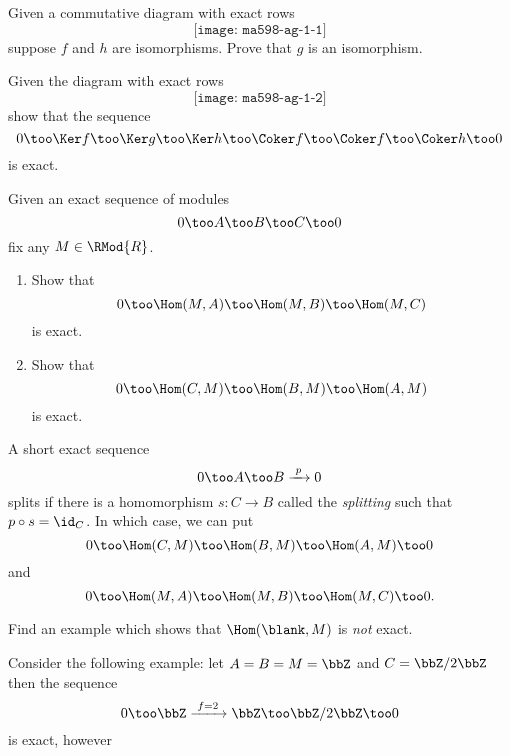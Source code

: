 \begin{problem}[\(\bm 5\)-lemma]
  Given a commutative diagram with exact rows
  \[
    \texttt{[image: ma598-ag-1-1]}
  \]
  suppose \(f\) and \(h\) are isomorphisms. Prove that \(g\) is an
  isomorphism.
\end{problem}
\begin{solution}

\end{solution}
\newpage

\begin{problem}
  Given the diagram with exact rows
  \[
    \texttt{[image: ma598-ag-1-2]}
  \]
  show that the sequence
  \[
    0\too
    \Ker f\too
    \Ker g\too
    \Ker h\too
    \Coker f\too
    \Coker f\too
    \Coker h\too
    0
  \]
  is exact.
\end{problem}
\begin{solution}
\end{solution}
\newpage

\begin{problem}
  Given an exact sequence of modules
  \[
    0\too A\too B\too C\too 0
  \]
  fix any \(M\in\RMod{R}\).
  \begin{enumerate}[label=(\alph*)]
  \item Show that
    \[
      0\too \Hom(M,A)\too\Hom(M,B)\too\Hom(M,C)
    \]
    is exact.
  \item Show that
    \[
      0\too \Hom(C,M)\too\Hom(B,M)\too\Hom(A,M)
    \]
    is exact.
  \end{enumerate}
\end{problem}
\begin{solution}
\end{solution}
\newpage

\begin{problem}
  A short exact sequence
  \[
    0\too A\too B\xrightarrow{\,\,p\,\,} 0
  \]
  splits if there is a homomorphism \(s\colon C\to B\) called the
  \emph{splitting} such that \(p\circ s=\id_C\). In which case, we can put
  \[
    0\too\Hom(C,M)\too\Hom(B,M)\too\Hom(A,M)\too 0
  \]
  and
  \[
    0\too\Hom(M,A)\too\Hom(M,B)\too\Hom(M,C)\too 0.
  \]
\end{problem}
\begin{solution}
\end{solution}
\newpage

\begin{problem}
  Find an example which shows that \(\Hom(\blank,M)\) is \emph{not} exact.
\end{problem}
\begin{solution}
  Consider the following example: let \(A=B=M=\bbZ\) and \(C=\bbZ/2\bbZ\)
  then the sequence
  \[
    0\too\bbZ\xrightarrow{\,\,f=2\,\,}\bbZ\too\bbZ/2\bbZ\too 0
  \]
  is exact, however
\end{solution}

